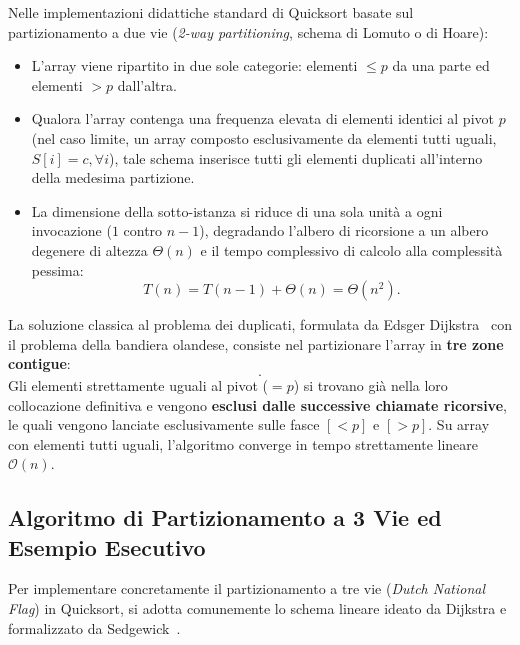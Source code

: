 Nelle implementazioni didattiche standard di Quicksort basate sul partizionamento a due vie (\textit{2-way partitioning}, schema di Lomuto o di Hoare):
\begin{itemize}
  \item L'array viene ripartito in due sole categorie: elementi $\le p$ da una parte ed elementi $> p$ dall'altra.
  \item Qualora l'array contenga una frequenza elevata di elementi identici al pivot $p$ (nel caso limite, un array composto esclusivamente da elementi tutti uguali, $S[i] = c, \forall i$), tale schema inserisce tutti gli elementi duplicati all'interno della medesima partizione.
  \item La dimensione della sotto-istanza si riduce di una sola unità a ogni invocazione ($1$ contro $n-1$), degradando l'albero di ricorsione a un albero degenere di altezza $\Theta(n)$ e il tempo complessivo di calcolo alla complessità pessima:
  \begin{equation}
    T(n) = T(n - 1) + \Theta(n) = \Theta(n^2).
  \end{equation}
\end{itemize}

\begin{definition}
La soluzione classica al problema dei duplicati, formulata da Edsger Dijkstra~\cite{dijkstra1976} con il problema della bandiera olandese, consiste nel partizionare l'array in \textbf{tre zone contigue}:
\begin{equation}
  [\, < p \quad \mid \quad = p \quad \mid \quad > p \,].
\end{equation}
Gli elementi strettamente uguali al pivot ($= p$) si trovano già nella loro collocazione definitiva e vengono \textbf{esclusi dalle successive chiamate ricorsive}, le quali vengono lanciate esclusivamente sulle fasce $[< p]$ e $[> p]$. Su array con elementi tutti uguali, l'algoritmo converge in tempo strettamente lineare $\mathcal{O}(n)$.
\end{definition}

\FloatBarrier
\subsection{Algoritmo di Partizionamento a 3 Vie ed Esempio Esecutivo}
\label{subsec:3way-quicksort-example}

Per implementare concretamente il partizionamento a tre vie (\textit{Dutch National Flag}) in Quicksort, si adotta comunemente lo schema lineare ideato da Dijkstra e formalizzato da Sedgewick~\cite{sedgewick1978}. 


